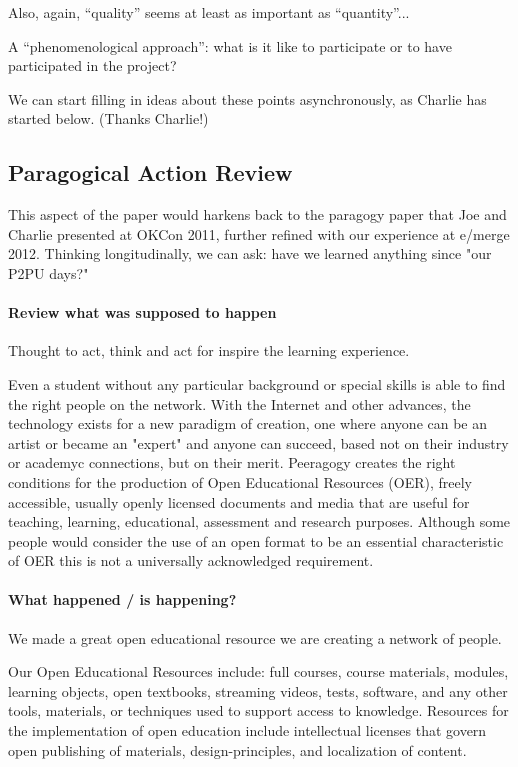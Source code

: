 \documentclass{acm_proc_article-sp}
\begin{document}
Also, again, ``quality'' seems at least as important as ``quantity''... 

A ``phenomenological approach'': what is it like to participate or to have participated in the project?

We can start filling in ideas about these points asynchronously, as Charlie has started below. (Thanks Charlie!)

\subsection{Paragogical Action Review}

This aspect of the paper would harkens back to the paragogy paper
that Joe and Charlie presented at OKCon 2011, further refined with our
experience at e/merge 2012.  Thinking longitudinally, we can ask: have
we learned anything since "our P2PU days?"

\paragraph{Review what was supposed to happen}

Thought to act, think and act for inspire the learning experience.

Even a student without any particular background or special skills is able to find the right people on the network. 
With the Internet and other advances, the technology exists for a new paradigm of creation, one where anyone can be an artist or became an "expert" and anyone can succeed, based not on their industry or academyc connections, but on their merit. Peeragogy creates the right conditions for the production of Open Educational Resources (OER), freely accessible, usually openly licensed documents and media that are useful for teaching, learning, educational, assessment and research purposes. Although some people would consider the use of an open format to be an essential characteristic of OER this is not a universally acknowledged requirement.
\paragraph{What happened / is happening?}
We made a great open educational resource
we are creating a network of people.

Our Open Educational Resources include: full courses, course materials, modules, learning objects, open textbooks, streaming videos, tests, software, and any other tools, materials, or techniques used to support access to knowledge. Resources for the implementation of open education include intellectual licenses that govern open publishing of materials, design-principles, and localization of content.
\end{document}
